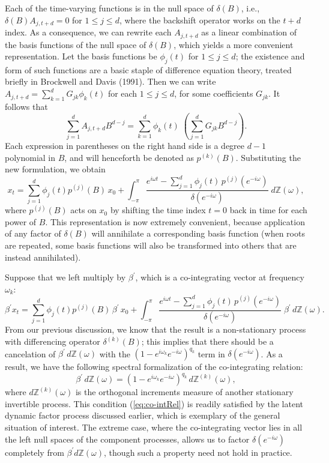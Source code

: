 \documentclass[a4paper]{book}
\def\ZZ{\mathbb Z}
\begin{document}
 Each of the time-varying functions is in the null
 space of $\delta (B)$, i.e., $\delta (B) A_{j, t+d} = 0$ for $1 \leq
 j \leq d$, where the backshift operator works on the $t+d$ index.
 As a consequence, we can rewrite each $A_{j,t+d}$ as a linear
 combination of the basis functions of the null space of $\delta
 (B)$, which yields a more convenient representation.  Let the basis
 functions be $\phi_j (t) $ for $1 \leq j \leq d$; the existence and
 form of such functions are a basic staple of difference equation
 theory, treated briefly in Brockwell and Davis (1991).  Then we can
 write $A_{j,t+d} = \sum_{k=1}^d G_{jk} \phi_k (t)$ for each $1 \leq
 j \leq d$, for some coefficients $G_{jk}$.  It follows that
\[
 \sum_{j=1}^d A_{j,t+d} B^{d-j} = \sum_{k=1}^d \phi_k (t)  \; \left(
 \sum_{j=1}^d G_{jk} B^{d-j} \right).
\]
 Each expression in parentheses on the right hand side is a degree
 $d-1$ polynomial in $B$, and will henceforth be denoted as $p^{(k)}
 (B)$.   Substituting the new formulation, we obtain
\[
 x_t = \sum_{j=1}^d \phi_j (t) p^{(j)} (B) \, x_{0} + \int_{-\pi}^{\pi}
 \frac{ e^{i \omega t} - \sum_{j=1}^d \phi_j (t) \, p^{(j)} ( e^{-i \omega
 } )}{ \delta (e^{-i \omega}) } \; d \ZZ (\omega),
\]
 where $p^{(j)} (B)$ acts on $x_0$ by shifting the time index $t=0$
 back in time for each power of $B$.  This representation is now
 extremely convenient, because application of any factor of
 $\delta(B)$ will annihilate a corresponding basis function (when
 roots are repeated, some basis functions will also be transformed
 into others that are instead annihilated). 

 Suppose that we left multiply by $\beta^{\prime}$,
 which is a co-integrating vector at frequency $\omega_k$:
\begin{equation}
 \label{eq:co-intRep}
  \beta^{\prime} x_t = \sum_{j=1}^d \phi_j (t) p^{(j)} (B) \, \beta^{\prime} \, x_{0} + \int_{-\pi}^{\pi}
 \frac{ e^{i \omega t} - \sum_{j=1}^d \phi_j (t) \, p^{(j)} ( e^{-i \omega
 } )}{ \delta (e^{-i \omega}) } \; \beta^{\prime} \, d \ZZ
 (\omega).
\end{equation}
  From our previous discussion, we know that the result is a non-stationary
 process with differencing operator $\delta^{(k)} (B)$; this implies
 that there should be a cancelation of $\beta^{\prime} \, d\ZZ
 (\omega)$ with the ${(1 - e^{i \omega_{k}} e^{-i\omega}
 )}^{q_{k}}$ term in $\delta (e^{-i \omega})$.  As a result, we
 have the following spectral formalization of the co-integrating
 relation:
\begin{equation}
\label{eq:co-intRel}
 \beta^{\prime} \, d\ZZ (\omega) = {(1 - e^{i \omega_{k}} e^{-i\omega}
 )}^{q_{k}} \, d\ZZ^{(k)} (\omega),
\end{equation}
 where $d \ZZ^{(k)} (\omega)$ is the orthogonal increments measure
 of another stationary invertible process.  This condition
 (\ref{eq:co-intRel}) is readily satisfied by the latent dynamic
 factor process discussed earlier, which is exemplary of the general
 situation of interest.  The extreme case, where the co-integrating
 vector lies in all the left null spaces of the component processes,
 allows us to factor $\delta (e^{-i \omega})$ completely from
 $\beta^{\prime} d \ZZ (\omega)$, though such a property need not
 hold in practice.  
\end{document}
